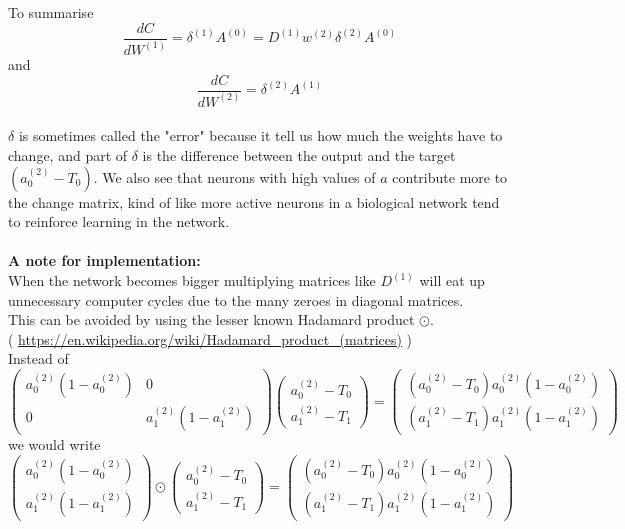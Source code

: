 \documentclass{article}
\begin{document}
To summarise
\[
\frac{dC}{dW^{(1)}} = \delta^{(1)} A^{(0)} = D^{(1)} w^{(2)} \delta^{(2)}  A^{(0)}
\]
and
\[
\frac{dC}{dW^{(2)}} = \delta^{(2)} A^{(1)}
\]
\\
$\delta$ is sometimes called the "error" because it tell us how much the weights have to change, and part of $\delta$ is the difference between the output and the target $(a_{0}^{(2)}-T_0)$. We also see that neurons with high values of $a$ contribute more to the change matrix, kind of like more active neurons in a biological network tend to reinforce learning in the network.
\\
\\
\textbf{A note for implementation:}
\\
When the network becomes bigger multiplying matrices like $D^{(1)}$ will eat up unnecessary computer cycles due to the many zeroes in diagonal matrices.
\\
This can be avoided by using the lesser known Hadamard product $\odot$.
\\
( \url{https://en.wikipedia.org/wiki/Hadamard_product_(matrices)} )
\\
Instead of
\[
\begin{pmatrix}
a_{0}^{(2)}(1-a_{0}^{(2)}) & 0 \\
0 & a_{1}^{(2)}(1-a_{1}^{(2)})
\end{pmatrix}
\begin{pmatrix}
a_{0}^{(2)}-T_0 \\ a_{1}^{(2)}-T_1
\end{pmatrix} =
\begin{pmatrix}
(a_0^{(2)}-T_0)a_0^{(2)}(1-a_0^{(2)}) \\ (a_1^{(2)}-T_1)a_1^{(2)}(1-a_1^{(2)})
\end{pmatrix}
\]
we would write
\\
\[
\begin{pmatrix}
a_{0}^{(2)}(1-a_{0}^{(2)}) \\
a_{1}^{(2)}(1-a_{1}^{(2)})
\end{pmatrix}
\odot
\begin{pmatrix}
a_{0}^{(2)}-T_0 \\ a_{1}^{(2)}-T_1
\end{pmatrix} =
\begin{pmatrix}
(a_0^{(2)}-T_0)a_0^{(2)}(1-a_0^{(2)}) \\ (a_1^{(2)}-T_1)a_1^{(2)}(1-a_1^{(2)})
\end{pmatrix}
\]
\end{document}
